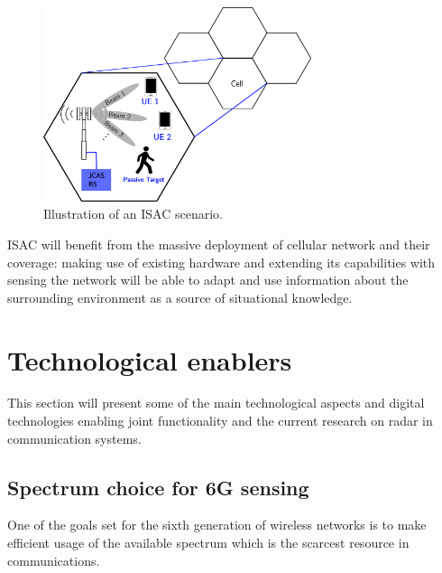 \begin{figure}[H]
	\centering
	\includegraphics[width=0.7\textwidth]{Images/introduction/isac-scheme-1.png}
	\caption{Illustration of an ISAC scenario.}
	\label{fig:isac-scheme-1}
\end{figure}


ISAC will benefit from the massive deployment of cellular network and their coverage: making use of existing hardware and extending its capabilities with sensing the network will be able to adapt and use information about the surrounding environment as a source of situational knowledge.



\section{Technological enablers}
	

	This section will present some of the main technological aspects and digital technologies enabling joint functionality and the current research on radar in communication systems.	
	
	\subsection{Spectrum choice for 6G sensing}

	One of the goals set for the sixth generation of wireless networks is to make efficient usage of the available spectrum which is the scarcest resource in communications.
	
